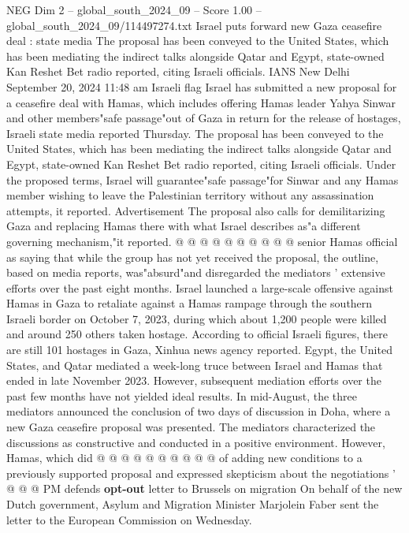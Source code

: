 \begin{textsample}{NEG Dim 2 – global\_south\_2024\_09 – Score 1.00 – global\_south\_2024\_09/114497274.txt}  \label{ex:f2_neg_251}
Israel puts forward new Gaza ceasefire deal : state media The proposal has been conveyed to the United States, which has been mediating the indirect talks alongside Qatar and Egypt, state-owned Kan Reshet Bet radio reported, citing Israeli officials.
IANS New Delhi September 20, 2024 11:48 am Israeli flag Israel has submitted a new proposal for a ceasefire deal with Hamas, which includes offering Hamas leader Yahya Sinwar and other members"safe passage"out of Gaza in return for the release of hostages, Israeli state media reported Thursday.
The proposal has been conveyed to the United States, which has been mediating the indirect talks alongside Qatar and Egypt, state-owned Kan Reshet Bet radio reported, citing Israeli officials.
Under the proposed terms, Israel will guarantee"safe passage"for Sinwar and any Hamas member wishing to leave the Palestinian territory without any assassination attempts, it reported.
Advertisement The proposal also calls for demilitarizing Gaza and replacing Hamas there with what Israel describes as"a different governing mechanism,"it reported. @ @ @ @ @ @ @ @ @ @ senior Hamas official as saying that while the group has not yet received the proposal, the outline, based on media reports, was"absurd"and disregarded the mediators ' extensive efforts over the past eight months.
Israel launched a large-scale offensive against Hamas in Gaza to retaliate against a Hamas rampage through the southern Israeli border on October 7, 2023, during which about 1,200 people were killed and around 250 others taken hostage.
According to official Israeli figures, there are still 101 hostages in Gaza, Xinhua news agency reported.
Egypt, the United States, and Qatar mediated a week-long truce between Israel and Hamas that ended in late November 2023.
However, subsequent mediation efforts over the past few months have not yielded ideal results.
In mid-August, the three mediators announced the conclusion of two days of discussion in Doha, where a new Gaza ceasefire proposal was presented.
The mediators characterized the discussions as constructive and conducted in a positive environment.
However, Hamas, which did @ @ @ @ @ @ @ @ @ @ of adding new conditions to a previously supported proposal and expressed skepticism about the negotiations ' @ @ @ PM defends \textbf{opt-out} letter to Brussels on migration On behalf of the new Dutch government, Asylum and Migration Minister Marjolein Faber sent the letter to the European Commission on Wednesday.

\end{textsample}
